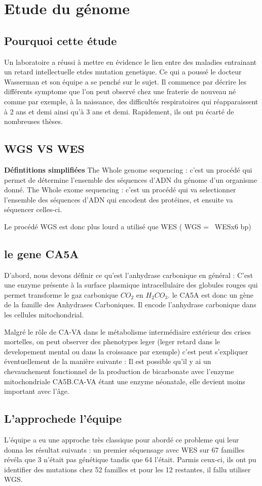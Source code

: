 \section{Etude du génome}

\subsection{Pourquoi cette étude}

Un laboratoire a réussi à mettre en évidence le lien entre des maladies entrainant un retard intellectuelle etdes mutation genetique.
Ce qui a poussé le docteur Wasserman et son équipe a se penché sur le sujet.
Il commence par décrire les différents symptome que l'on peut observé chez une fraterie de nouveau né comme par exemple, à la naissance, des difficultés respiratoires qui réapparaissent à 2 ans et demi ainsi qu'à 3 ans et demi.
Rapidement, ils ont pu écarté de nombreuses thèses.

\subsection{WGS VS WES}
\textbf{Défintitions simplifiées}
The Whole genome sequencing : c'est un procédé qui permet de détermine l'ensemble des séquences d'ADN du génome d'un organisme donné.
The Whole exome sequencing : c'est un procédé qui va selectionner l'ensemble des séquences d'ADN qui encodent des protéines, et ensuite va séquencer celles-ci.

Le procédé WGS est donc plus lourd a utilisé que WES ( WGS = ~WESx6 bp)

\subsection{le gene CA5A}
D'abord, nous devons définir ce qu'est l'anhydrase carbonique en général : 
C'est une enzyme présente à la surface plasmique intracellulaire des globules rouges qui permet transforme le gaz carbonique $CO_2$ en $H_2CO_3$.
le CA5A est donc un gène de la famille des Anhydrases Carboniques. Il encode l'anhydrase carbonique dans les cellules mitochondrial.

Malgré le rôle de CA-VA dans le métabolisme intermédiaire extérieur des crises mortelles, on peut observer des phenotypes leger (leger retard dans le developement mental ou dans la croissance par exemple)
c'est peut s'expliquer éventuellement de la manière suivante :
Il est possible qu'il y ai un chevauchement fonctionnel de la production de bicarbonate avec l'enzyme mitochondriale CA5B.CA-VA étant une enzyme néonatale, elle devient moins important avec l'âge.

\subsection{L'approchede l'équipe}

L'équipe a eu une approche très classique pour abordé ce probleme qui leur donna les résultat suivants :
un premier séquensage avec WES sur 67 familles révéla que 3 n'était pas génétique tandis que 64 l'était. Parmis ceux-ci, ils ont pu identifier des mutations chez 52 familles et pour les 12 restantes, il fallu utiliser WGS.

